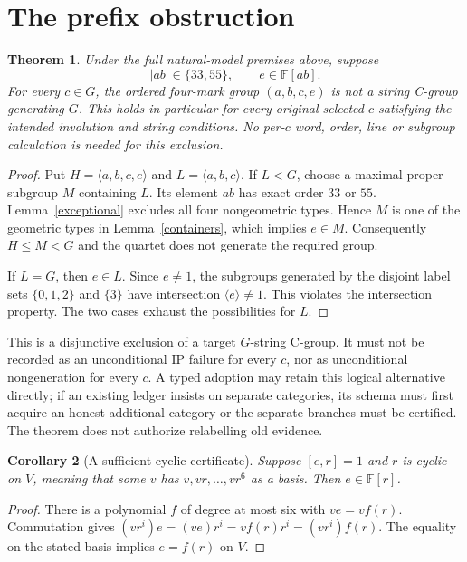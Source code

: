 \documentclass[11pt]{article}
\newtheorem{theorem}{Theorem}
\newtheorem{corollary}[theorem]{Corollary}
\newcommand{\F}{\mathbb F}
\newcommand{\gen}[1]{\langle #1\rangle}
\begin{document}
\section{The prefix obstruction}

\begin{theorem}\label{main}
Under the full natural-model premises above, suppose
\[
 |ab|\in\{33,55\},\qquad e\in\F[ab].
\]
For every $c\in G$, the ordered four-mark group $(a,b,c,e)$ is not a
string C-group generating $G$. This holds in particular for every
original selected $c$ satisfying the intended involution and string
conditions. No per-$c$ word, order, line or subgroup calculation is needed
for this exclusion.
\end{theorem}
\begin{proof}
Put $H=\gen{a,b,c,e}$ and $L=\gen{a,b,c}$. If $L<G$, choose a maximal
proper subgroup $M$ containing $L$. Its element $ab$ has exact order
$33$ or $55$. Lemma~\ref{exceptional} excludes all four nongeometric
types. Hence $M$ is one of the geometric types in
Lemma~\ref{containers}, which implies $e\in M$. Consequently
$H\leq M<G$ and the quartet does not generate the required group.

If $L=G$, then $e\in L$. Since $e\ne1$, the subgroups generated by
the disjoint label sets $\{0,1,2\}$ and $\{3\}$ have intersection
$\gen e\ne1$. This violates the intersection property. The two cases
exhaust the possibilities for $L$.
\end{proof}

This is a disjunctive exclusion of a target $G$-string C-group. It must
not be recorded as an unconditional IP failure for every $c$, nor as
unconditional nongeneration for every $c$. A typed adoption may retain
this logical alternative directly; if an existing ledger insists on
separate categories, its schema must first acquire an honest additional
category or the separate branches must be certified. The theorem does
not authorize relabelling old evidence.

\begin{corollary}[A sufficient cyclic certificate]\label{cyclic}
Suppose $[e,r]=1$ and $r$ is cyclic on $V$, meaning that some $v$ has
$v,vr,\ldots,vr^6$ as a basis. Then $e\in\F[r]$.
\end{corollary}
\begin{proof}
There is a polynomial $f$ of degree at most six with $ve=vf(r)$.
Commutation gives $(vr^i)e=(ve)r^i=vf(r)r^i=(vr^i)f(r)$.
The equality on the stated basis implies $e=f(r)$ on $V$.
\end{proof}
\end{document}
